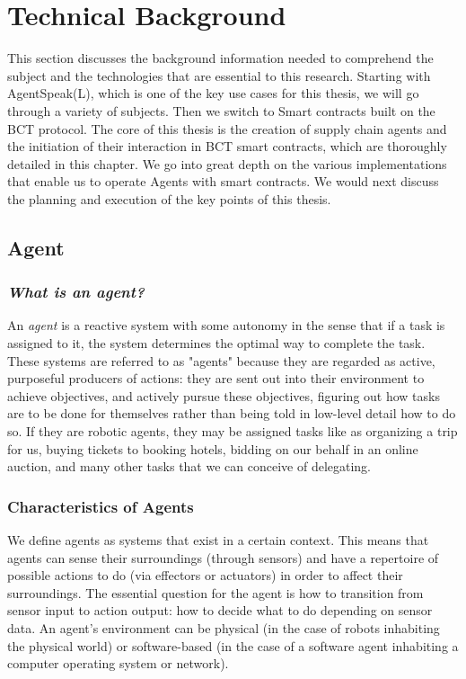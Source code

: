 \ifx\doclanguage\english
\chapter{Technical Background}

This section discusses the background information needed to comprehend the subject and the technologies that are essential to this research. Starting with AgentSpeak(L), which is one of the key use cases for this thesis, we will go through a variety of subjects. Then we switch to Smart contracts built on the \ac{BCT} protocol. The core of this thesis is the creation of supply chain agents and the initiation of their interaction in \ac{BCT} smart contracts, which are thoroughly detailed in this chapter. We go into great depth on the various implementations that enable us to operate Agents with smart contracts. We would next discuss the planning and execution of the key points of this thesis.

\section{Agent}

\subsection{\textit{What is an agent?}}
An \textit{agent} is a reactive system with some autonomy in the sense that if a task is assigned to it, the system determines the optimal way to complete the task. These systems are referred to as "agents" because they are regarded as active, purposeful producers of actions: they are sent out into their environment to achieve objectives, and actively pursue these objectives, figuring out how tasks are to be done for themselves rather than being told in low-level detail how to do so. If they are robotic agents, they may be assigned tasks like as organizing a trip for us, buying tickets to booking hotels, bidding on our behalf in an online auction, and many other tasks that we can conceive of delegating.


\subsection{Characteristics of Agents}

We define agents as systems that exist in a certain context. This means that agents can sense their surroundings (through sensors) and have a repertoire of possible actions to do (via effectors or actuators) in order to affect their surroundings. The essential question for the agent is how to transition from sensor input to action output: how to decide what to do depending on sensor data. An agent's environment can be physical (in the case of robots inhabiting the physical world) or software-based (in the case of a software agent inhabiting a computer operating system or network).

